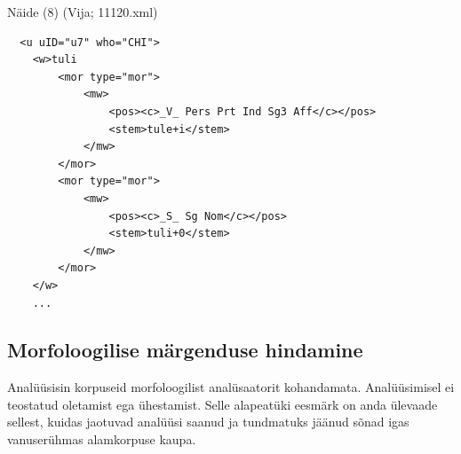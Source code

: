 \documentclass[12pt]{article}
\begin{document}
Näide (8) (Vija; 11120.xml)
\begin{lstlisting}
  <u uID="u7" who="CHI">
    <w>tuli
        <mor type="mor">
            <mw>
                <pos><c>_V_ Pers Prt Ind Sg3 Aff</c></pos>
                <stem>tule+i</stem>
            </mw>
        </mor>
        <mor type="mor">
            <mw>
                <pos><c>_S_ Sg Nom</c></pos>
                <stem>tuli+0</stem>
            </mw>
        </mor>
    </w>
    ...
\end{lstlisting}

\subsection{Morfoloogilise märgenduse hindamine}

Analüüsisin korpuseid morfoloogilist analüsaatorit kohandamata. Analüüsimisel ei teostatud oletamist ega ühestamist. Selle alapeatüki eesmärk on anda ülevaade sellest, kuidas jaotuvad analüüsi saanud ja tundmatuks jäänud sõnad igas vanuserühmas alamkorpuse kaupa.
\end{document}
